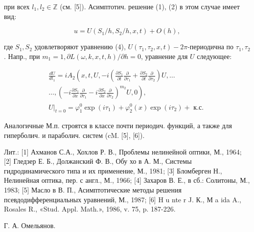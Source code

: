 \documentclass[10pt]{article}
\begin{document}
при всех $l_{1}, l_{2} \in \mathbb{Z}$ (см. [5]). Асимптотич. решение (1), (2) в этом случае имеет вид:



\[

u=U\left(S_{1} / h, S_{2} / h, x, t\right)+O(h),

\]



где $S_{1}, S_{2}$ удовлетворяют уравнению (4), $U\left(\tau_{1}, \tau_{2}, x, t\right)-2 \pi$-периодична по $\tau_{1}, \tau_{2}$. Напр., при $m_{1}=1, \partial L(\omega, k, x, t, h) / \partial h=0$, уравнение для $U$ следующее:



\[

\begin{gathered}

\frac{d U}{d t_{1}}=i A_{2}\left(x, t, U,-i\left(\frac{\partial S_{1}}{\partial t} \frac{\partial}{\partial \tau_{1}}+\frac{\partial S_{2}}{\partial t} \frac{\partial}{\partial \tau_{2}}\right) U, \ldots\right. \\

\left.\ldots,\left(-i \frac{\partial S_{1}}{\partial x} \frac{\partial}{\partial \tau_{1}}-i \frac{\partial S_{2}}{\partial x} \frac{\partial}{\partial \tau_{2}}\right)^{m_{2}} U, 0\right), \\

\left.U\right|_{t=0}=\varphi_{1}^{0} \exp \left(i \tau_{1}\right)+\varphi_{2}^{0}(x) \exp \left(i \tau_{2}\right)+\text { к.с. }

\end{gathered}

\]



Аналогичные М.п. строятся в классе почти периодич. функций, а также для гиперболич. и параболич. систем (cM. [5], [6]).



Лит.: [1] Ахманов С.А., Хохлов Р. В., Проблемы нелинейной оптики, М., 1964; [2] Гледзер Е. Б., Должанский Ф. В., Обу хо в А. М., Системы гидродинамического типа и их применение, М., 1981; [3] Бломберген Н., Нелинейная оптика, пер. с англ., М., 1966; [4] Захаров В. Е., в сб.: Солитоны, М., 1983; [5] Масло в В. П., Асимптотические методы решения псевдодифференциальных уравнений, М., 1987; [6] H u nte r J. К., М a ida A., Rosales R., «Stud. Appl. Math.», 1986, v. 75, p. 187-226.



Г. А. Омельянов.
\end{document}
